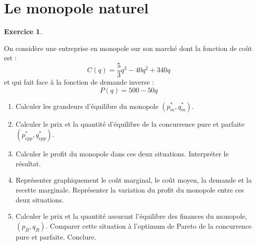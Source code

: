 \documentclass[
]{book}
\providecommand{\tightlist}{%
  \setlength{\itemsep}{0pt}\setlength{\parskip}{0pt}}
\theoremstyle{definition}
\theoremstyle{definition}
\theoremstyle{definition}
\newtheorem{exercise}{Exercice}[chapter]
\theoremstyle{definition}
\theoremstyle{remark}
\begin{document}
\hypertarget{le-monopole-naturel-1}{%
\section{Le monopole naturel}\label{le-monopole-naturel-1}}

\begin{exercise}
\protect\hypertarget{exr:naturelexo1}{}\label{exr:naturelexo1}

On considère une entreprise en monopole sur son marché dont la fonction de coût est :
\[C(q)=\frac{5}{3}q^3-40q^2+340q\]
et qui fait face à la fonction de demande inverse :
\[P(q)=500-50q\]

\begin{enumerate}
\def\labelenumi{\arabic{enumi}.}
\tightlist
\item
  Calculer les grandeurs d'équilibre du monopole \((p^*_m,q^*_m)\).
\item
  Calculer le prix et la quantité d'équilibre de la concurrence pure et parfaite \((p^*_{cpp},q^*_{cpp}).\)
\item
  Calculer le profit du monopole dans ces deux situations. Interpréter le résultat.
\item
  Représenter graphiquement le coût marginal, le coût moyen, la demande et la recette marginale. Représenter la variation du profit du monopole entre ces deux situations.
\item
  Calculer le prix et la quantité assurant l'équilibre des finances du monopole, \((p_{B},q_{B})\). Comparer cette situation à l'optimum de Pareto de la concurrence pure et parfaite. Conclure.
\end{enumerate}

\end{exercise}
\end{document}

